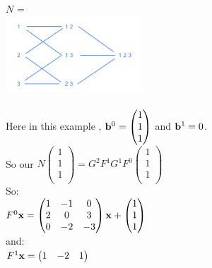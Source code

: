 \begin{example}
    $N$ = \\
     \includegraphics[width=2in]{images/Chapter 10/P123.png}\\
    \\
     Here in this example , ${\vb}^{0} = \begin{pmatrix}
        1\\
        1\\
        1\\
        \end{pmatrix}$ and ${\vb}^{1} = 0$.\\
    So our $N\begin{pmatrix}
        1\\
        1\\
        1\\
        \end{pmatrix} = G^{2}F^{1}G^{1}F^{0}\begin{pmatrix}
        1\\
        1\\
        1\\
        \end{pmatrix}$\\
        So:\\
        $F^{0}{\vx} = \begin{pmatrix}
        1 & -1 & 0\\
        2 & 0 & 3\\
        0 & -2 & -3\\
        \end{pmatrix}{\vx} + \begin{pmatrix}
        1\\
        1\\
        1\\
        \end{pmatrix}$\\
        and:\\
        $F^{1}{\vx} = \begin{pmatrix}
        1 & -2 & 1
        \end{pmatrix}$


\end{example}
